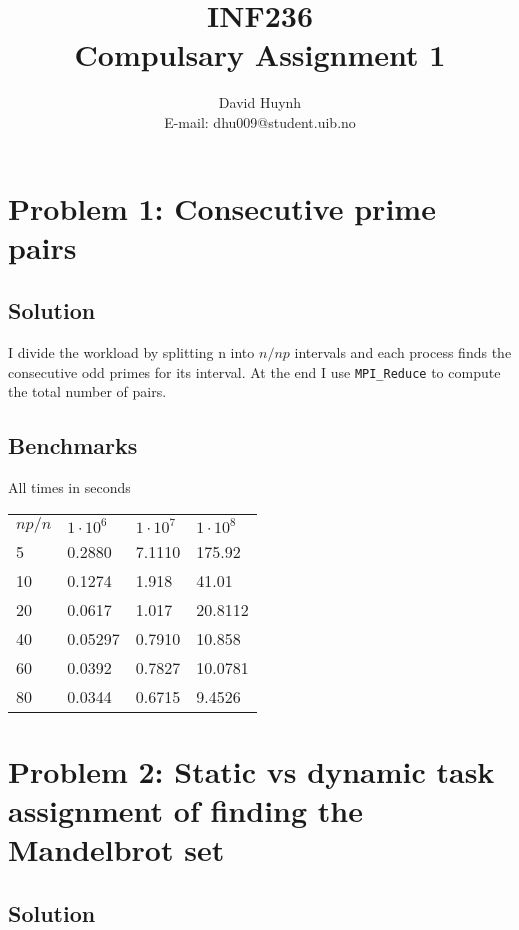 \documentclass{article}
\begin{document}
\title{INF236\\ Compulsary Assignment 1}
\author{David Huynh\\ E-mail: dhu009@student.uib.no}
\date{}

\maketitle

\section*{Problem 1: Consecutive prime pairs}

\subsection*{Solution}

I divide the workload by splitting n into $n/np$ intervals and each process finds the consecutive odd primes for its interval. At the end I use \verb|MPI_Reduce| to compute the total number of pairs.

\subsection*{Benchmarks}

All times in seconds
\begin{table}[h]
\begin{tabular}{llll}
$np/n$ & $1\cdotp10^{6}$ & $1\cdotp10^{7}$ & $1\cdotp10^{8}$\\
5 & 0.2880 & 7.1110 & 175.92\\
10 & 0.1274 & 1.918 & 41.01\\
20 & 0.0617 & 1.017 & 20.8112\\
40 & 0.05297 & 0.7910 & 10.858\\
60 & 0.0392 & 0.7827 & 10.0781\\
80 & 0.0344  & 0.6715 & 9.4526
\end{tabular}
\end{table}

\section*{Problem 2: Static vs dynamic task assignment of finding the Mandelbrot set}

\subsection*{Solution}
\end{document}
